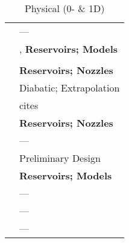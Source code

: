 \begin{appendices}
\begin{table}
{\begin{subfloatrow}
{\begin{tabular}{@{}m{}m{}@{}}
		\textcite{schiffmann_design_2010} & ---\\
		\textcite{schlador_erstellung_2008} & \fortran{}, \textbf{Reservoirs; Models}\\
		\textcite{schur_transient_2013} & \smlnk{}\\
		\textcite{serrano_model_2008} & \textbf{Reservoirs; Nozzles}\\
		\textcite{shaaban_experimental_2004} & Diabatic; Extrapolation\\
		\textcite{stuart_analysis_2014} & cites \autocite{harley_evaluation_2013}\\
		\textcite{taburri_model-based_2012} & \textbf{Reservoirs; Nozzles}\\
		\textcite{uchida_transient_2006} & ---\\
		\textcite{whitfield_preliminary_1990} & Preliminary Design\\
		\textcite{wirz_berechnungsmethode_2017} & \textbf{Reservoirs; Models}\\
		\textcite{xu_empirical_2012} & ---\\
		\textcite{zahn_arbeitsspielaufgeloste_2012} & ---\\
		\textcite{zhuge_development_2009} & ---\\
	\bottomrule
	\end{tabular}
}%
{%
	\caption{Physical (0- \& 1D)}%
	\label{tab:works_physical}%
}%
\end{subfloatrow}}
\end{table}
\end{appendices}
